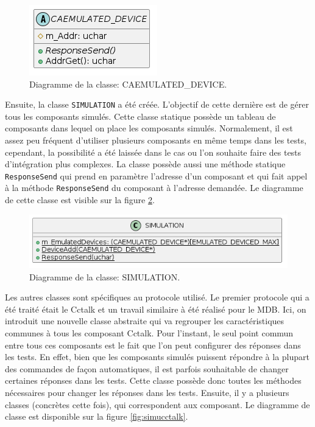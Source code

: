 \documentclass[a4paper]{article}
\begin{document}
\begin{figure}[h!]
  \begin{center}
  \includegraphics[scale=0.5]{./graphs/emulated_device.png}
  \caption{Diagramme de la classe: CAEMULATED\_DEVICE.}
    \label{fig:caemulateddevice}
  \end{center}
\end{figure}

Ensuite, la classe \verb|SIMULATION| a été créée. L'objectif de cette dernière
est de gérer tous les composants simulés. Cette classe statique possède un
tableau de composants dans lequel on place les composants simulés. Normalement,
il est assez peu fréquent d'utiliser plusieurs composants en même temps dans les
tests, cependant, la possibilité a été laissée dans le cas ou l'on souhaite
faire des tests d'intégration plus complexes. La classe possède aussi une
méthode statique \verb|ResponseSend| qui prend en paramètre l'adresse d'un
composant et qui fait appel à la méthode \verb|ResponseSend| du composant à
l'adresse demandée. Le diagramme de cette classe est visible sur la figure
\ref{fig:simulationclasse}.

\begin{figure}[h!]
  \begin{center}
  \includegraphics[scale=0.5]{./graphs/simulation_classe.png}
    \caption{Diagramme de la classe: SIMULATION.}
    \label{fig:simulationclasse}
  \end{center}
\end{figure}

Les autres classes sont spécifiques au protocole utilisé. Le premier protocole
qui a été traité était le Cctalk et un travail similaire à été réalisé pour le
MDB. Ici, on introduit une nouvelle classe abstraite qui va regrouper les
caractéristiques communes à tous les composant Cctalk. Pour l'instant, le seul
point commun entre tous ces composants est le fait que l'on peut configurer des
réponses dans les tests. En effet, bien que les composants simulés puissent
répondre à la plupart des commandes de façon automatiques, il est parfois
souhaitable de changer certaines réponses dans les tests. Cette classe possède
donc toutes les méthodes nécessaires pour changer les réponses dans les tests.
Ensuite, il y a plusieurs classes (concrètes cette fois), qui correspondent aux
composant. Le diagramme de classe est disponible sur la figure \ref{fig:simucctalk}.
\end{document}
